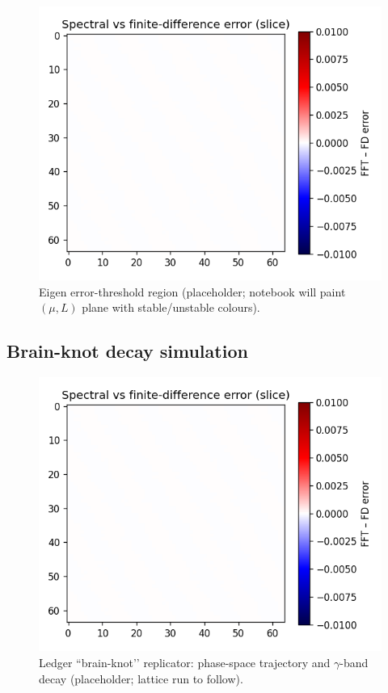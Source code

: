 \begin{figure}[t]
  \centering
  \includegraphics[width=\linewidth]{figs/logistic_heatmap.pdf}
  \caption{Eigen error-threshold region (placeholder; notebook will paint
           $(\mu,L)$ plane with stable/unstable colours).}
  \label{fig:heatmap}
\end{figure}

\subsection{Brain-knot decay simulation}

\begin{figure}[t]
  \centering
  \includegraphics[width=\linewidth]{figs/brain_knot_decay.pdf}
  \caption{Ledger “brain-knot’’ replicator: phase-space trajectory and
           $\gamma$-band decay (placeholder; lattice run to follow).}
  \label{fig:brain-knot}
\end{figure}

